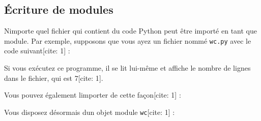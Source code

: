 \hypertarget{uxe9criture-de-modules}{%
\subsection{Écriture de modules}\label{uxe9criture-de-modules}}

N\textquotesingle importe quel fichier qui contient du code Python peut
être importé en tant que module. Par exemple, supposons que vous ayez un
fichier nommé \texttt{wc.py} avec le code suivant{[}cite: 1{]} :

\begin{Shaded}
\begin{Highlighting}[]
\OperatorTok{=} 
     
\OperatorTok{+=} 

\NormalTok{)}
\end{Highlighting}
\end{Shaded}

Si vous exécutez ce programme, il se lit lui-même et affiche le nombre
de lignes dans le fichier, qui est 7{[}cite: 1{]}.

Vous pouvez également l\textquotesingle importer de cette façon{[}cite:
1{]} :

\begin{Shaded}
\begin{Highlighting}[]
\OperatorTok{\textgreater{}\textgreater{}\textgreater{}} 
\end{Highlighting}
\end{Shaded}

Vous disposez désormais d\textquotesingle un objet module
\texttt{wc}{[}cite: 1{]} :

\begin{Shaded}
\begin{Highlighting}[]
\OperatorTok{\textgreater{}\textgreater{}\textgreater{}} 
\OperatorTok{\textless{}}  \OperatorTok{\textgreater{}}
\end{Highlighting}
\end{Shaded}

